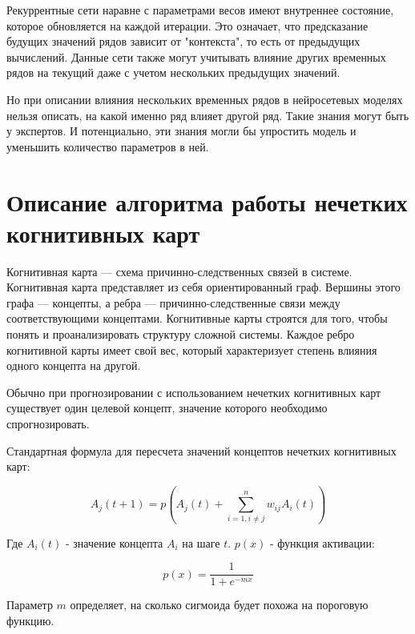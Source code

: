Рекуррентные сети наравне с параметрами весов имеют внутреннее состояние, которое обновляется на каждой
итерации. Это означает, что предсказание будущих значений рядов зависит от "контекста",
то есть от предыдущих вычислений. Данные сети также могут учитывать влияние других
временных рядов на текущий даже с учетом нескольких предыдущих значений.

Но при описании влияния нескольких временных рядов в нейросетевых моделях
нельзя описать, на какой именно ряд влияет другой ряд. Такие знания могут быть у
экспертов. И потенциально, эти знания могли бы упростить модель и уменьшить количество
параметров в ней.



\section{Описание алгоритма работы нечетких когнитивных карт}

Когнитивная карта --- схема причинно-следственных связей в системе.
Когнитивная карта представляет из себя ориентированный граф.
Вершины этого графа --- концепты, а ребра --- причинно-следственные связи между соответствующими концептами.
Когнитивные карты строятся для того, чтобы понять и проанализировать структуру сложной системы.
Каждое ребро когнитивной карты имеет свой вес, который характеризует степень влияния одного концепта на другой.

Обычно при прогнозировании с использованием нечетких когнитивных карт существует один целевой концепт,
значение которого необходимо спрогнозировать.

Стандартная формула для пересчета значений концептов нечетких когнитивных карт:

\begin{equation}\label{eq:concepts_recalc}
	A_j(t+1) = p( A_j(t) + \sum_{i = 1, i \neq j}^{n} w_{ij} A_i(t) )
\end{equation}

\noindent Где $ A_i(t) $ - значение концепта $A_i$ на шаге $t$. $ p(x) $ - функция активации:

\begin{equation}\label{eq:sigmiog_actiovation}
	p(x) = \frac {1} {1+ e^{-mx} }
\end{equation}

\noindent Параметр $ m $ определяет, на сколько сигмоида будет похожа на пороговую функцию.

